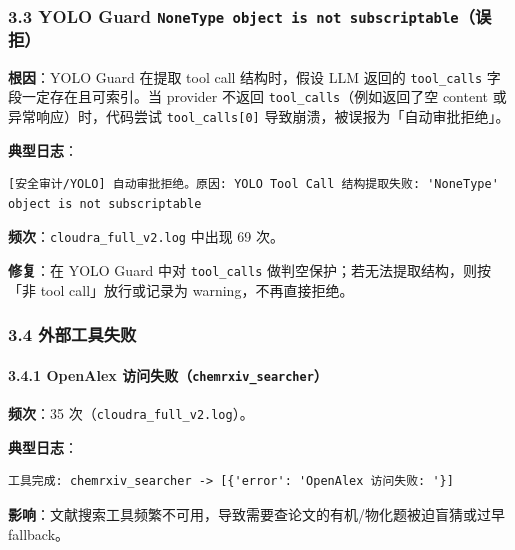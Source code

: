 \documentclass[
]{achemso}
\begin{document}
\hypertarget{yolo-guard-nonetype-object-is-not-subscriptableux8befux62d2}{%
\subsubsection{\texorpdfstring{3.3 YOLO Guard
\texttt{NoneType\ object\ is\ not\ subscriptable}（误拒）}{3.3 YOLO Guard NoneType object is not subscriptable（误拒）}}\label{yolo-guard-nonetype-object-is-not-subscriptableux8befux62d2}}

\textbf{根因}：YOLO Guard 在提取 tool call 结构时，假设 LLM 返回的
\texttt{tool\_calls} 字段一定存在且可索引。当 provider 不返回
\texttt{tool\_calls}（例如返回了空 content 或异常响应）时，代码尝试
\texttt{tool\_calls{[}0{]}} 导致崩溃，被误报为「自动审批拒绝」。

\textbf{典型日志}：

\begin{verbatim}
[安全审计/YOLO] 自动审批拒绝。原因: YOLO Tool Call 结构提取失败: 'NoneType' object is not subscriptable
\end{verbatim}

\textbf{频次}：\texttt{cloudra\_full\_v2.log} 中出现 69 次。

\textbf{修复}：在 YOLO Guard 中对 \texttt{tool\_calls}
做判空保护；若无法提取结构，则按「非 tool call」放行或记录为
warning，不再直接拒绝。

\hypertarget{ux5916ux90e8ux5de5ux5177ux5931ux8d25}{%
\subsubsection{3.4
外部工具失败}\label{ux5916ux90e8ux5de5ux5177ux5931ux8d25}}

\hypertarget{openalex-ux8bbfux95eeux5931ux8d25chemrxiv_searcher}{%
\paragraph{\texorpdfstring{3.4.1 OpenAlex
访问失败（\texttt{chemrxiv\_searcher}）}{3.4.1 OpenAlex 访问失败（chemrxiv\_searcher）}}\label{openalex-ux8bbfux95eeux5931ux8d25chemrxiv_searcher}}

\textbf{频次}：35 次（\texttt{cloudra\_full\_v2.log}）。

\textbf{典型日志}：

\begin{verbatim}
工具完成: chemrxiv_searcher -> [{'error': 'OpenAlex 访问失败: '}]
\end{verbatim}

\textbf{影响}：文献搜索工具频繁不可用，导致需要查论文的有机/物化题被迫盲猜或过早
fallback。
\end{document}
